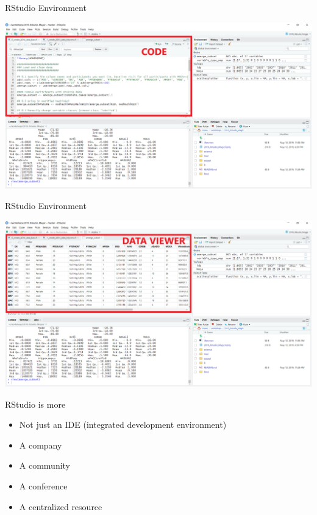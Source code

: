 \documentclass[
  ignorenonframetext,
]{beamer}
\providecommand{\tightlist}{%
  \setlength{\itemsep}{0pt}\setlength{\parskip}{0pt}}
\begin{document}
\begin{frame}{RStudio Environment}
\protect\hypertarget{rstudio-environment-4}{}

\includegraphics{../external/images/rstudio_terminal_4_CODE.png}

\end{frame}

\begin{frame}{RStudio Environment}
\protect\hypertarget{rstudio-environment-5}{}

\includegraphics{../external/images/rstudio_terminal_5_DATA.png}

\end{frame}

\begin{frame}{RStudio is more}
\protect\hypertarget{rstudio-is-more}{}

\begin{itemize}[<+->]
\tightlist
\item
  Not just an IDE (integrated development environment)
\item
  A company
\item
  A community
\item
  A conference
\item
  A centralized resource
\end{itemize}

\end{frame}
\end{document}
